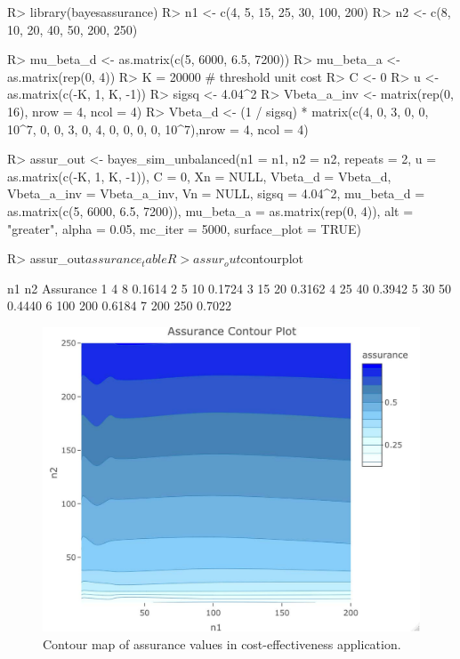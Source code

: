 \begin{Schunk}
\begin{Sin}
R> library(bayesassurance)
R> n1 <- c(4, 5, 15, 25, 30, 100, 200)
R> n2 <- c(8, 10, 20, 40, 50, 200, 250)

R> mu_beta_d <- as.matrix(c(5, 6000, 6.5, 7200))
R> mu_beta_a <- as.matrix(rep(0, 4))
R> K = 20000 # threshold unit cost
R> C <- 0
R> u <- as.matrix(c(-K, 1, K, -1))
R> sigsq <- 4.04^2
R> Vbeta_a_inv <- matrix(rep(0, 16), nrow = 4, ncol = 4)
R> Vbeta_d <- (1 / sigsq) * matrix(c(4, 0, 3, 0, 0, 10^7, 0, 0, 
3, 0, 4, 0, 0, 0, 0, 10^7),nrow = 4, ncol = 4)

R> assur_out <- bayes_sim_unbalanced(n1 = n1, n2 = n2, repeats = 2, 
		u = as.matrix(c(-K, 1, K, -1)), C = 0, Xn = NULL, 
		Vbeta_d = Vbeta_d, Vbeta_a_inv = Vbeta_a_inv,
		Vn = NULL, sigsq = 4.04^2, 
		mu_beta_d = as.matrix(c(5, 6000, 6.5, 7200)), 
		mu_beta_a = as.matrix(rep(0, 4)), 
		alt = "greater", alpha = 0.05, mc_iter = 5000,  
		surface_plot = TRUE)
		
R> assur_out$assurance_table
R> assur_out$contourplot
\end{Sin}
\begin{Sout}
   n1  n2 Assurance
1   4   8    0.1614
2   5  10    0.1724
3  15  20    0.3162
4  25  40    0.3942
5  30  50    0.4440
6 100 200    0.6184
7 200 250    0.7022
\end{Sout}
\end{Schunk}

\begin{figure}[t!]
\centering
\includegraphics[width = 10 cm]{ex6_contourplot.pdf}
\caption{\label{fig:ex6} Contour map of assurance values in
cost-effectiveness application.}
\end{figure}



